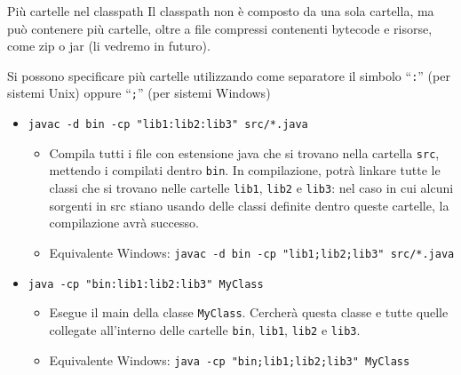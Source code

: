 \documentclass[xcolor=dvipsnames,presentation]{beamer}
\begin{document}
\begin{frame}{Più cartelle nel classpath}
    Il classpath non è composto da una sola cartella, ma può contenere più cartelle, oltre a file compressi contenenti bytecode e risorse, come zip o jar (li vedremo in futuro).
    \begin{block}{}
        Si possono specificare più cartelle utilizzando come separatore il simbolo ``\texttt{:}'' (per sistemi Unix) oppure ``\texttt{;}'' (per sistemi Windows)
        \begin{itemize}
            \item \texttt{javac -d bin -cp "lib1:lib2:lib3" src/*.java}
            \begin{itemize}
                \item Compila tutti i file con estensione java che si trovano nella cartella \texttt{src}, mettendo i compilati dentro \texttt{bin}. In compilazione, potrà linkare tutte le classi che si trovano nelle cartelle \texttt{lib1}, \texttt{lib2} e \texttt{lib3}: nel caso in cui alcuni sorgenti in src stiano usando delle classi definite dentro queste cartelle, la compilazione avrà successo.
                \item \scriptsize{Equivalente Windows: \texttt{javac -d bin -cp "lib1;lib2;lib3" src/*.java}}
        \end{itemize}
            \item \texttt{java -cp "bin:lib1:lib2:lib3" MyClass}
            \begin{itemize}
                \item Esegue il main della classe \texttt{MyClass}. Cercherà questa classe e tutte quelle collegate all'interno delle cartelle \texttt{bin}, \texttt{lib1}, \texttt{lib2} e \texttt{lib3}.
                \item \scriptsize{Equivalente Windows: \texttt{java -cp "bin;lib1;lib2;lib3" MyClass}}
            \end{itemize}
        \end{itemize}
    \end{block}
\end{frame}
\end{document}
